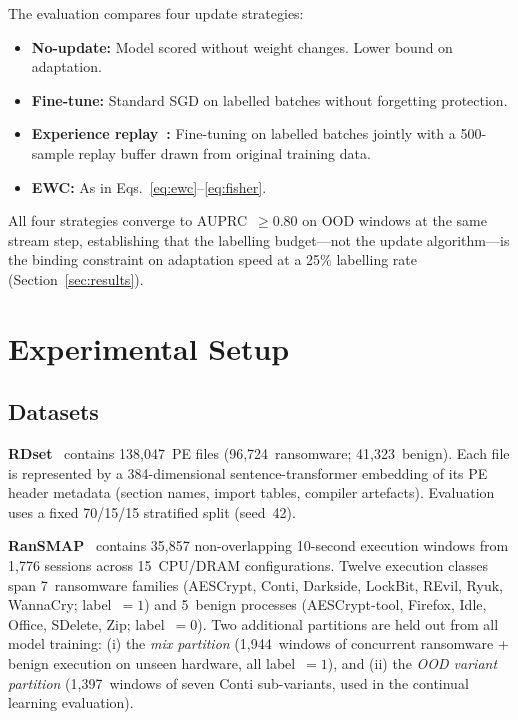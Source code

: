 \documentclass[journal]{IEEEtran}
\begin{document}
The evaluation compares four update strategies:
\begin{itemize}
\item \textbf{No-update:} Model scored without weight changes. Lower bound on adaptation.
\item \textbf{Fine-tune:} Standard SGD on labelled batches without forgetting protection.
\item \textbf{Experience replay~\cite{rolnick2019experience}:} Fine-tuning on labelled
  batches jointly with a 500-sample replay buffer drawn from original training data.
\item \textbf{EWC:} As in Eqs.~\eqref{eq:ewc}--\eqref{eq:fisher}.
\end{itemize}
All four strategies converge to AUPRC~$\geq 0.80$ on OOD windows at the same stream step,
establishing that the labelling budget---not the update algorithm---is the binding
constraint on adaptation speed at a 25\% labelling rate (Section~\ref{sec:results}).

\section{Experimental Setup}
\label{sec:experiments}

\subsection{Datasets}

\textbf{RDset}~\cite{kabuye2025explainable} contains 138,047~PE files
(96,724~ransomware; 41,323~benign).
Each file is represented by a 384-dimensional sentence-transformer embedding of its PE
header metadata (section names, import tables, compiler artefacts).
Evaluation uses a fixed 70/15/15 stratified split (seed~42).

\textbf{RanSMAP}~\cite{hirano2025ransmap} contains 35,857 non-overlapping 10-second
execution windows from 1,776 sessions across 15~CPU/DRAM configurations.
Twelve execution classes span 7~ransomware families (AESCrypt, Conti, Darkside, LockBit,
REvil, Ryuk, WannaCry; label~$= 1$) and 5~benign processes (AESCrypt-tool, Firefox, Idle,
Office, SDelete, Zip; label~$= 0$).
Two additional partitions are held out from all model training:
(i) the \emph{mix partition} (1,944~windows of concurrent ransomware + benign execution on
unseen hardware, all label~$= 1$), and
(ii) the \emph{OOD variant partition} (1,397~windows of seven Conti sub-variants,
used in the continual learning evaluation).
\end{document}
